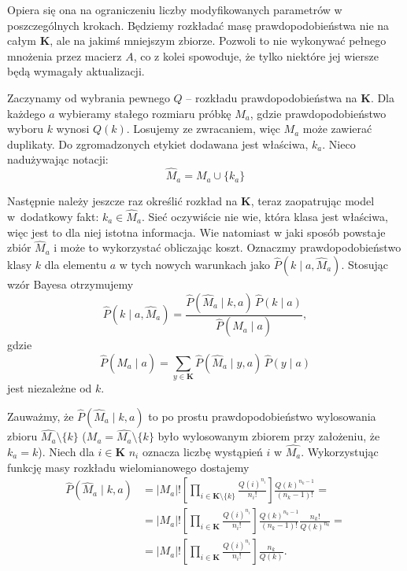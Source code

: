 Opiera się ona na ograniczeniu liczby modyfikowanych parametrów w poszczególnych krokach. Będziemy rozkładać masę prawdopodobieństwa nie na całym $\mathbf{K}$, ale na jakimś mniejszym zbiorze. Pozwoli to nie wykonywać pełnego mnożenia przez macierz $A$, co z kolei spowoduje, że tylko niektóre jej wiersze będą wymagały aktualizacji.

Zaczynamy od wybrania pewnego $Q$ -- rozkładu prawdopodobieństwa na $\mathbf{K}$. Dla każdego $a$ wybieramy stałego rozmiaru próbkę $M_a$, gdzie prawdopodobieństwo wyboru $k$ wynosi $Q(k)$. Losujemy ze zwracaniem, więc $M_a$ może zawierać duplikaty. Do zgromadzonych etykiet dodawana jest właściwa, $k_a$. Nieco nadużywając notacji:
\[\hat{M}_a = M_a \cup \{k_a\}\]

Następnie należy jeszcze raz określić rozkład na $\mathbf{K}$, teraz zaopatrując model w~dodatkowy fakt: $k_a \in \hat{M}_a$. Sieć oczywiście nie wie, która klasa jest właściwa, więc jest to dla niej istotna informacja. Wie natomiast w jaki sposób powstaje zbiór $\hat{M}_a$ i może to wykorzystać obliczając koszt. Oznaczmy prawdopodobieństwo klasy $k$ dla elementu $a$ w tych nowych warunkach jako $\hat{P}(k \mid a, \hat{M}_a)$. Stosując wzór Bayesa otrzymujemy
\[\hat{P}(k \mid a, \hat{M}_a) = \frac{\hat{P}(\hat{M}_a \mid k, a)\, \hat{P}(k \mid a)}{\hat{P}(\hat{M}_a \mid a)},\]
gdzie
\[\hat{P}(\hat{M}_a \mid a) = \sum_{y \in \mathbf{K}} \hat{P}(\hat{M}_a \mid y, a)\, \hat{P}(y \mid a)\]
jest niezależne od $k$.

Zauważmy, że $\hat{P}(\hat{M}_a \mid k, a)$ to po prostu prawdopodobieństwo wylosowania zbioru $\hat{M_a} \setminus \{k\}$ ($M_a = \hat{M_a} \setminus \{k\}$ było wylosowanym zbiorem przy założeniu, że $k_a = k$). Niech dla $i \in \mathbf{K}$ $n_i$ oznacza liczbę wystąpień $i$ w $\hat{M_a}$. Wykorzystując funkcję masy rozkładu wielomianowego dostajemy
\[
\begin{aligned}
    \hat{P}(\hat{M}_a \mid k, a) &= |M_a|! \left[ \prod\limits_{i \in \mathbf{K} \setminus \{k\}} \frac{Q(i)^{n_i}}{n_i!} \right] \frac{Q(k)^{n_k-1}}{(n_k-1)!}= \\[3pt]
    & = |M_a|! \left[ \prod\limits_{i \in \mathbf{K}} \frac{Q(i)^{n_i}}{n_i!} \right]  \frac{Q(k)^{n_k-1}}{(n_k-1)!}  \frac{n_k!}{Q(k)^{n_k}} =\\[3pt]
    & = |M_a|! \left[ \prod\limits_{i \in \mathbf{K}} \frac{Q(i)^{n_i}}{n_i!} \right] \frac{n_k}{Q(k)}.
\end{aligned}
\]

